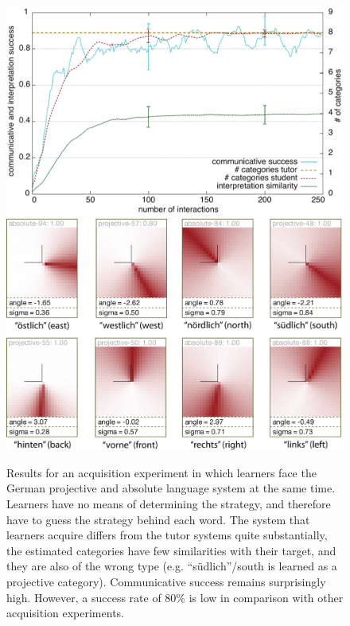 \begin{figure} 
\begin{center}
\includegraphics[width=0.8\columnwidth]{figs/category-acquisition-projective+absolute-results+categories-1}
\includegraphics[width=0.8\columnwidth]{figs/category-acquisition-projective+absolute-results+categories-2.png}
\end{center}
\caption[Results for acquisition of projective and absolute systems]{%
Results for an acquisition experiment in which learners face 
the German projective and absolute language system at the same time. 
Learners have no means of determining the strategy, and therefore have 
to guess the strategy behind each word. The system that learners 
acquire differs from the tutor systems quite substantially, the estimated 
categories have few similarities with their target, and they are 
also of the wrong type (e.g. ``s\"udlich''/south is learned as a projective category).
Communicative success remains surprisingly high. 
However, a success rate of 80\% is low in comparison with other acquisition experiments.}
\label{f:category-acquisition-projective+absolute-results}
\end{figure}



